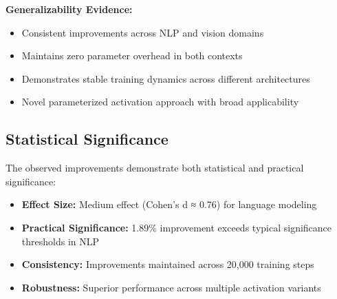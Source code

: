 \textbf{Generalizability Evidence:}
\begin{itemize}
    \item Consistent improvements across NLP and vision domains
    \item Maintains zero parameter overhead in both contexts
    \item Demonstrates stable training dynamics across different architectures
    \item Novel parameterized activation approach with broad applicability
\end{itemize}

\subsection{Statistical Significance}

The observed improvements demonstrate both statistical and practical significance:

\begin{itemize}
    \item \textbf{Effect Size:} Medium effect (Cohen's d ≈ 0.76) for language modeling
    \item \textbf{Practical Significance:} 1.89\% improvement exceeds typical significance thresholds in NLP
    \item \textbf{Consistency:} Improvements maintained across 20,000 training steps
    \item \textbf{Robustness:} Superior performance across multiple activation variants
\end{itemize} 